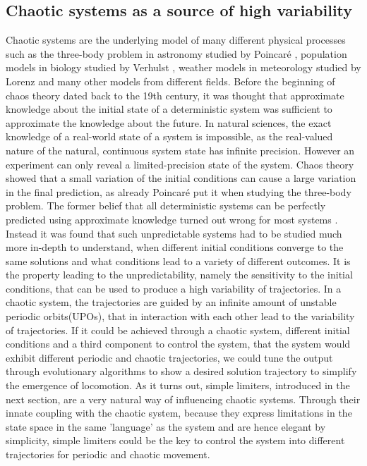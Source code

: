 \documentclass[main]{subfiles}
\begin{document}
\subsection{Chaotic systems as a source of high variability}

Chaotic systems are the underlying model of many different physical processes such as the three-body problem in astronomy studied by Poincaré \cite{bib:Poincare1892}, population models in biology studied by Verhulst \cite{bib:Verhulst1838}, weather models in meteorology studied by Lorenz \cite{bib:Lorenz1963} and many other models from different fields. %
%
Before the beginning of chaos theory dated back to the 19th century, it was thought that approximate knowledge about the initial state of a deterministic system was sufficient to approximate the knowledge about the future. In natural sciences, the exact knowledge of a real-world state of a system is impossible, as the real-valued nature of the natural, continuous system state has infinite precision. %
%
However an experiment can only reveal a limited-precision state of the system. %
%
Chaos theory showed that a small variation of the initial conditions can cause a large variation in the final prediction, as already Poincaré put it when studying the three-body problem. %
%
The former belief that all deterministic systems can be perfectly predicted using approximate knowledge turned out wrong for most systems \cite{bib:Motter2013}. %
%
Instead it was found that such unpredictable systems had to be studied much more in-depth to understand, when different initial conditions converge to the same solutions and what conditions lead to a variety of different outcomes. %
%
It is the property leading to the unpredictability, namely the sensitivity to the initial conditions, that can be used to produce a high variability of trajectories. %
%
In a chaotic system, the trajectories are guided by an infinite amount of unstable periodic orbits(UPOs), that in interaction with each other lead to the variability of trajectories. %
%
If it could be achieved through a chaotic system, different initial conditions and a third component to control the system, that the system would exhibit different periodic and chaotic trajectories, we could tune the output through evolutionary algorithms to show a desired solution trajectory to simplify the emergence of locomotion. %
%
As it turns out, simple limiters, introduced in the next section, are a very natural way of influencing chaotic systems. %
%
Through their innate coupling with the chaotic system, because they express limitations in the state space in the same 'language' as the system and are hence elegant by simplicity, simple limiters could be the key to control the system into different trajectories for periodic and chaotic movement.
\end{document}
